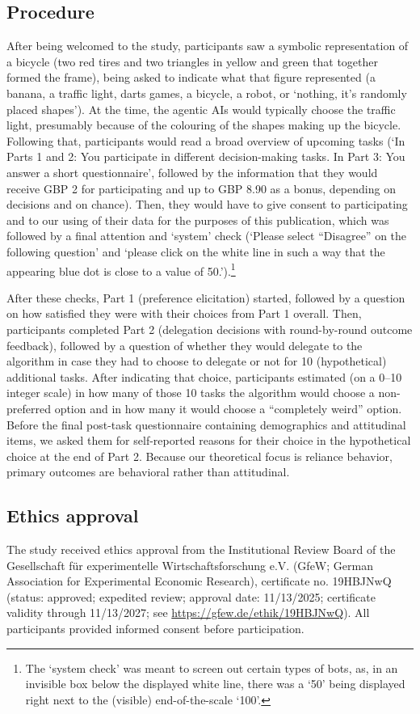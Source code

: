 \documentclass[a4paper, 12pt, fleqn]{article}
\theoremstyle{definition}
\begin{document}
\subsection{Procedure}
After being welcomed to the study, participants saw a symbolic representation of a bicycle (two red tires and two triangles in yellow and green that together formed the frame), being asked to indicate what that figure represented (a banana, a traffic light, darts games, a bicycle, a robot, or `nothing, it's randomly placed shapes'). At the time, the agentic AIs would typically choose the traffic light, presumably because of the colouring of the shapes making up the bicycle. Following that, participants would read a broad overview of upcoming tasks (`In Parts 1 and 2: You participate in different decision-making tasks. In Part 3: You answer a short questionnaire', followed by the information that they would receive GBP 2 for participating and up to GBP 8.90 as a bonus, depending on decisions and on chance). Then, they would have to give consent to participating and to our using of their data for the purposes of this publication, which was followed by a final 
attention and `system' check (`Please select ``Disagree'' on the following question' and `please click on the white line in such a way that the appearing blue dot is close to a value of 50.').\footnote{The `system check' was meant to screen out certain types of bots, as, in an invisible box below the displayed white line, there was a `50' being displayed right next to the (visible) end-of-the-scale `100'.}

After these checks, Part 1 (preference elicitation) started, followed by a question on how satisfied they were with their choices from Part 1 overall. Then, participants completed Part 2 (delegation decisions with round-by-round outcome feedback), followed by a question of whether they would delegate to the algorithm in case they had to choose to delegate or not for 10 (hypothetical) additional tasks. After indicating that choice, participants estimated (on a 0--10 integer scale) in how many of those 10 tasks the algorithm would choose a non-preferred option and in how many it would choose a ``completely weird'' option. Before the final post-task questionnaire containing demographics and attitudinal items, we asked them for self-reported reasons for their choice in the hypothetical choice at the end of Part 2. Because our theoretical focus is reliance behavior, primary outcomes are behavioral rather than attitudinal.

\subsection{Ethics approval}
The study received ethics approval from the Institutional Review Board of the Gesellschaft für experimentelle Wirtschaftsforschung e.V. (GfeW; German Association for Experimental Economic Research), certificate no. 19HBJNwQ (status: approved; expedited review; approval date: 11/13/2025; certificate validity through 11/13/2027; see {\footnotesize\url{https://gfew.de/ethik/19HBJNwQ}}). All participants provided informed consent before participation.
\end{document}

